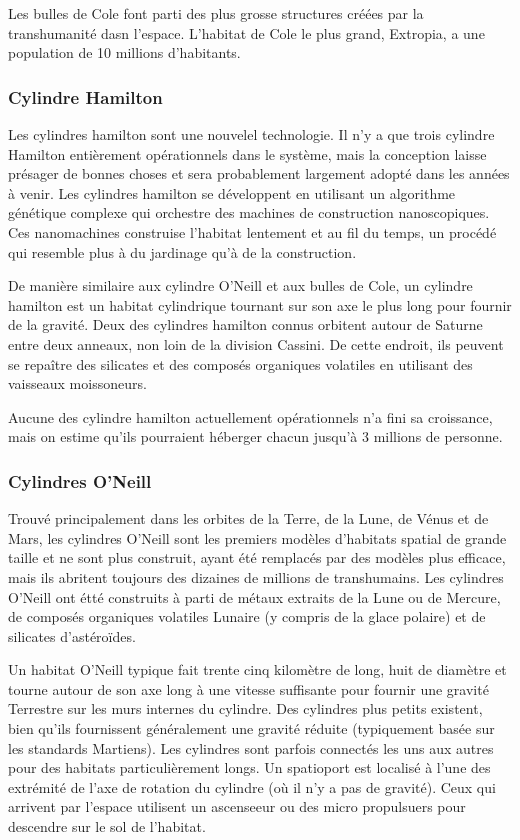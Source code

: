 Les bulles de Cole font parti des plus grosse structures créées par la transhumanité dasn l'espace. L'habitat de Cole le plus grand, Extropia, a une population de 10 millions d'habitants. 

\subsubsection{Cylindre Hamilton} 

Les cylindres hamilton sont une nouvelel technologie. Il n'y a que trois cylindre Hamilton entièrement opérationnels dans le système, mais la conception laisse présager de bonnes choses et sera probablement largement adopté dans les années à venir. Les cylindres hamilton se développent en utilisant un algorithme génétique complexe qui orchestre des machines de construction nanoscopiques. Ces nanomachines construise l'habitat lentement et au fil du temps, un procédé qui resemble plus à du jardinage qu'à de la construction. 

De manière similaire aux cylindre O'Neill et aux bulles de Cole, un cylindre hamilton est un habitat cylindrique tournant sur son axe le plus long pour fournir de la gravité. Deux des cylindres hamilton connus orbitent autour de Saturne entre deux anneaux, non loin de la division Cassini. De cette endroit, ils peuvent se repaître des silicates et des composés organiques volatiles en utilisant des vaisseaux moissoneurs. 

Aucune des cylindre hamilton actuellement opérationnels n'a fini sa croissance, mais on estime qu'ils pourraient héberger chacun jusqu'à 3 millions de personne. 

\subsubsection{Cylindres O'Neill} 

Trouvé principalement dans les orbites de la Terre, de la Lune, de Vénus et de Mars, les cylindres O'Neill sont les premiers modèles d'habitats spatial de grande taille et ne sont plus construit, ayant été remplacés par des modèles plus efficace, mais ils abritent toujours des dizaines de millions de transhumains. Les cylindres O'Neill ont étté construits à parti de métaux extraits de la Lune ou de Mercure, de composés organiques volatiles Lunaire (y compris de la glace polaire) et de silicates d'astéroïdes. 

Un habitat O'Neill typique fait trente cinq kilomètre de long, huit de diamètre et tourne autour de son axe long à une vitesse suffisante pour fournir une gravité Terrestre sur les murs internes du cylindre. Des cylindres plus petits existent, bien qu'ils fournissent généralement une gravité réduite (typiquement basée sur les standards Martiens). Les cylindres sont parfois connectés les uns aux autres pour des habitats particulièrement longs. Un spatioport est localisé à l'une des extrémité de l'axe de rotation du cylindre (où il n'y a pas de gravité). Ceux qui arrivent par l'espace utilisent un ascenseeur ou des micro propulsuers pour descendre sur le sol de l'habitat. 


